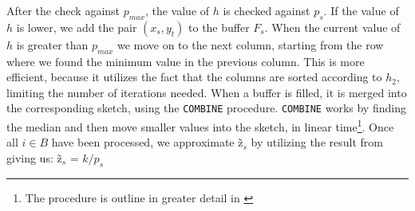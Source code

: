 \documentclass[a4paper,11pt]{article}
\begin{document}
After the check against $p_{max}$, the value of $h$ is checked against $p_s$. If the value of $h$ is lower, we add the pair $(x_s, y_t)$ to the buffer $F_s$. When the current value of $h$ is greater than $p_{max}$ we move on to the next column, starting from the row where we found the minimum value in the previous column. This is more efficient, because it utilizes the fact that the columns are sorted according to $h_2$, limiting the number of iterations needed. When a buffer is filled, it is merged into the corresponding sketch, using the \texttt{COMBINE} procedure. \texttt{COMBINE} works by finding the median and then move smaller values into the sketch, in linear time\footnote{The procedure is outline in greater detail in \cite{paper:amossen}}. Once all $i \in B$ have been processed, we approximate \~{z}$_s$ by utilizing the result from \cite{paper:bar-yos} giving us: \~{z}$_s$ = $k/p_s$





\end{document}
